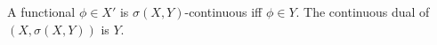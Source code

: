 A functional $\phi\in X'$ is $\sigma(X,Y)$-continuous iff $\phi\in Y$. The continuous dual of $(X,\sigma(X,Y))$ is $Y$.
